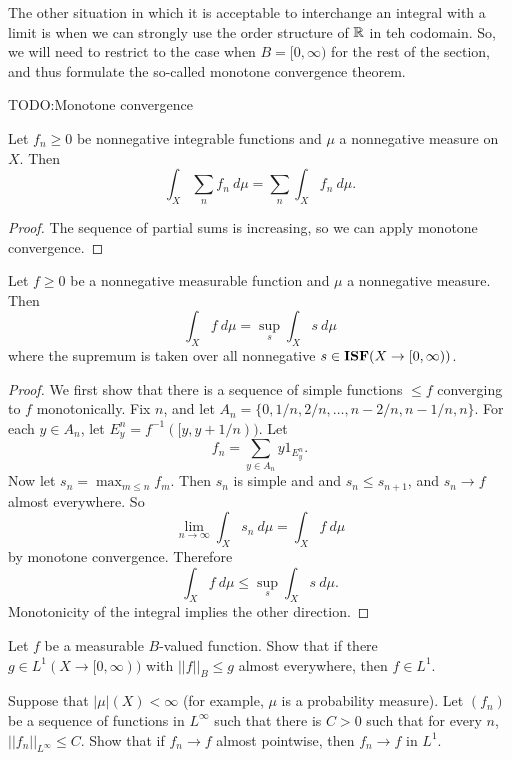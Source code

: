 \begin{subsec}
The other situation in which it is acceptable to interchange an integral with a limit is when we can strongly use the order structure of $\mathbb{R}$ in teh codomain.
So, we will need to restrict to the case when $B = [0, \infty)$ for the rest of the section, and thus formulate the so-called monotone convergence theorem.
\end{subsec}

TODO:\@ Monotone convergence

\begin{corollary}\label{positive summation}
Let $f_{n} \geq 0$ be nonnegative integrable functions and $\mu$ a nonnegative measure on $X$. Then
\[\int_{X} \sum_{n} f_{n}~d\mu = \sum_{n} \int_{X} f_{n}~d\mu.\]
\end{corollary}
\begin{proof}
The sequence of partial sums is increasing, so we can apply monotone convergence.
\end{proof}

\begin{corollary}
Let $f \geq 0$ be a nonnegative measurable function and $\mu$ a nonnegative measure. Then
\[\int_{X} f~d\mu = \sup_{s} \int_{X} s~d\mu\]
where the supremum is taken over all nonnegative $s \in \mathbf{ISF}(X \to [0, \infty))$.
\end{corollary}
\begin{proof}
We first show that there is a sequence of simple functions $\leq f$ converging to $f$ monotonically.
Fix $n$, and let $A_{n} = \{0, 1/n, 2/n, \dots, n - 2/n, n - 1/n, n\}$.
For each $y \in A_{n}$, let $E_{y}^{n} = f^{-1}([y, y + 1/n))$. Let
\[f_{n} = \sum_{y \in A_{n}} y1_{E_{y}^{n}}.\]
Now let $s_{n} = \max_{m \leq n} f_{m}$.
Then $s_{n}$ is simple and and $s_{n} \leq s_{n+1}$, and $s_{n} \to f$ almost everywhere.
So
\[\lim_{n \to \infty} \int_{X} s_{n}~d\mu = \int_{X} f~d\mu\]
by monotone convergence. Therefore
\[\int_{X} f~d\mu \leq \sup_{s} \int_{X} s~d\mu.\]
Monotonicity of the integral implies the other direction.
\end{proof}


\begin{exercise}
Let $f$ be a measurable $B$-valued function. Show that if there $g \in L^{1}(X \to [0, \infty))$ with $||f||_{B} \leq g$ almost everywhere, then $f \in L^{1}$.
\end{exercise}

\begin{exercise}
Suppose that $|\mu|(X) < \infty$ (for example, $\mu$ is a probability measure). Let $(f_{n})$ be a sequence of functions in $L^{\infty}$ such that there is $C > 0$ such that for every $n$, $||f_{n}||_{L^{\infty}} \leq C$.
Show that if $f_{n} \to f$ almost pointwise, then $f_{n} \to f$ in $L^{1}$.
\end{exercise}

